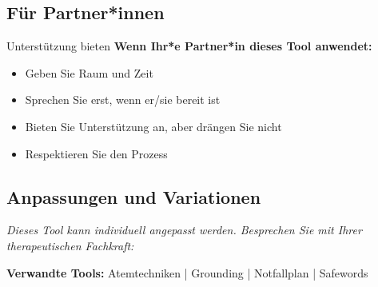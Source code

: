 \subsection{Für Partner*innen}

\begin{ctmmGreenBox}{Unterstützung bieten}
\textbf{Wenn Ihr*e Partner*in dieses Tool anwendet:}
\begin{itemize}
    \item Geben Sie Raum und Zeit
    \item Sprechen Sie erst, wenn er/sie bereit ist
    \item Bieten Sie Unterstützung an, aber drängen Sie nicht
    \item Respektieren Sie den Prozess
\end{itemize}
\end{ctmmGreenBox}

\subsection{Anpassungen und Variationen}
\textit{Dieses Tool kann individuell angepasst werden. Besprechen Sie mit Ihrer therapeutischen Fachkraft:}


\vspace{1cm}
\begin{center}
\faCompass{} \textcolor{ctmmBlue}{\textbf{Verwandte Tools:}} 
\textcolor{ctmmGray}{Atemtechniken | Grounding | Notfallplan | Safewords}
\end{center}